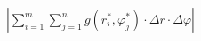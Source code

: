 \documentclass[preview]{standalone}
\begin{document}
\begin{align*}
\left| \sum_{i=1}^m \sum_{j=1}^n g\left(r_i^*, \varphi_j^*\right) \cdot \Delta r \cdot \Delta \varphi \right|
\end{align*}
\end{document}
